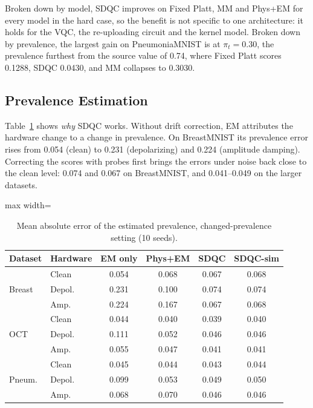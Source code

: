 \documentclass[conference]{IEEEtran}
\begin{document}
Broken down by model, SDQC improves on Fixed Platt, MM and Phys+EM for every model in the hard case, so the benefit is not specific to one architecture: it holds for the VQC, the re-uploading circuit and the kernel model. Broken down by prevalence, the largest gain on PneumoniaMNIST is at $\pi_t=0.30$, the prevalence furthest from the source value of 0.74, where Fixed Platt scores 0.1288, SDQC 0.0430, and MM collapses to 0.3030.

\subsection{Prevalence Estimation}

Table~\ref{tab:prior} shows \emph{why} SDQC works. Without drift correction, EM attributes the hardware change to a change in prevalence. On BreastMNIST its prevalence error rises from 0.054 (clean) to 0.231 (depolarizing) and 0.224 (amplitude damping). Correcting the scores with probes first brings the errors under noise back close to the clean level: 0.074 and 0.067 on BreastMNIST, and 0.041--0.049 on the larger datasets.

\begin{table}[t]
\centering
\caption{Mean absolute error of the estimated prevalence, changed-prevalence setting (10 seeds).}
\label{tab:prior}
\setlength{\tabcolsep}{3.5pt}
\begin{adjustbox}{max width=\linewidth}
\begin{tabular}{llcccc}
\toprule
Dataset & Hardware & EM only & Phys+EM & SDQC & SDQC-sim \\
\midrule
\multirow{3}{*}{Breast}
 & Clean  & 0.054 & 0.068 & 0.067 & 0.068 \\
 & Depol. & 0.231 & 0.100 & 0.074 & 0.074 \\
 & Amp.   & 0.224 & 0.167 & 0.067 & 0.068 \\
\midrule
\multirow{3}{*}{OCT}
 & Clean  & 0.044 & 0.040 & 0.039 & 0.040 \\
 & Depol. & 0.111 & 0.052 & 0.046 & 0.046 \\
 & Amp.   & 0.055 & 0.047 & 0.041 & 0.041 \\
\midrule
\multirow{3}{*}{Pneum.}
 & Clean  & 0.045 & 0.044 & 0.043 & 0.044 \\
 & Depol. & 0.099 & 0.053 & 0.049 & 0.050 \\
 & Amp.   & 0.068 & 0.070 & 0.046 & 0.046 \\
\bottomrule
\end{tabular}
\end{adjustbox}
\end{table}
\end{document}
